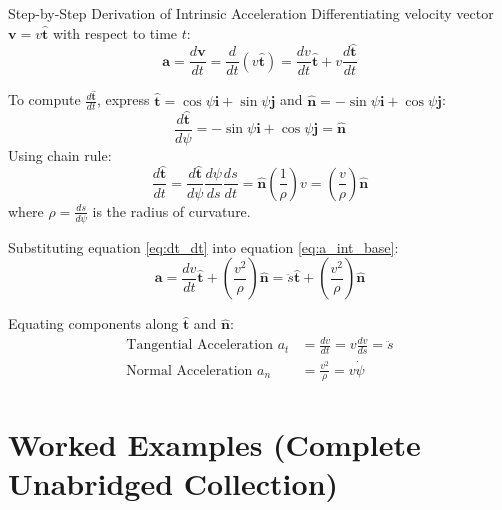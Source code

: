 \begin{proofbox}{Step-by-Step Derivation of Intrinsic Acceleration}
Differentiating velocity vector $\mathbf{v} = v \hat{\mathbf{t}}$ with respect to time $t$:
\begin{equation}
    \mathbf{a} = \frac{d\mathbf{v}}{dt} = \frac{d}{dt}(v \hat{\mathbf{t}}) = \frac{dv}{dt} \hat{\mathbf{t}} + v \frac{d\hat{\mathbf{t}}}{dt} \label{eq:a_int_base}
\end{equation}

To compute $\frac{d\hat{\mathbf{t}}}{dt}$, express $\hat{\mathbf{t}} = \cos\psi \mathbf{i} + \sin\psi \mathbf{j}$ and $\hat{\mathbf{n}} = -\sin\psi \mathbf{i} + \cos\psi \mathbf{j}$:
\begin{equation*}
    \frac{d\hat{\mathbf{t}}}{d\psi} = -\sin\psi \mathbf{i} + \cos\psi \mathbf{j} = \hat{\mathbf{n}}
\end{equation*}
Using chain rule:
\begin{equation}
    \frac{d\hat{\mathbf{t}}}{dt} = \frac{d\hat{\mathbf{t}}}{d\psi} \frac{d\psi}{ds} \frac{ds}{dt} = \hat{\mathbf{n}} \left( \frac{1}{\rho} \right) v = \left( \frac{v}{\rho} \right) \hat{\mathbf{n}} \label{eq:dt_dt}
\end{equation}
where $\rho = \frac{ds}{d\psi}$ is the radius of curvature.

Substituting equation \eqref{eq:dt_dt} into equation \eqref{eq:a_int_base}:
\begin{equation}
    \mathbf{a} = \frac{dv}{dt} \hat{\mathbf{t}} + \left( \frac{v^2}{\rho} \right) \hat{\mathbf{n}} = \ddot{s} \hat{\mathbf{t}} + \left( \frac{v^2}{\rho} \right) \hat{\mathbf{n}}
\end{equation}

Equating components along $\hat{\mathbf{t}}$ and $\hat{\mathbf{n}}$:
\begin{align}
    \text{Tangential Acceleration } a_t &= \frac{dv}{dt} = v \frac{dv}{ds} = \ddot{s} \\
    \text{Normal Acceleration } a_n &= \frac{v^2}{\rho} = v \dot{\psi}
\end{align}
\end{proofbox}

\section{Worked Examples (Complete Unabridged Collection)}

